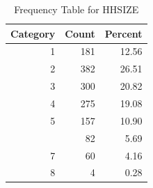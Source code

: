 \begin{table}[!h]
\centering
\caption{\label{tab:tab:HHSIZE}Frequency Table for HHSIZE}
\centering
\begin{tabular}[t]{rrr}
\toprule
Category & Count & Percent\\
\midrule
1 & 181 & 12.56\\
2 & 382 & 26.51\\
3 & 300 & 20.82\\
4 & 275 & 19.08\\
5 & 157 & 10.90\\
\addlinespace
6 & 82 & 5.69\\
7 & 60 & 4.16\\
8 & 4 & 0.28\\
\bottomrule
\end{tabular}
\end{table}
